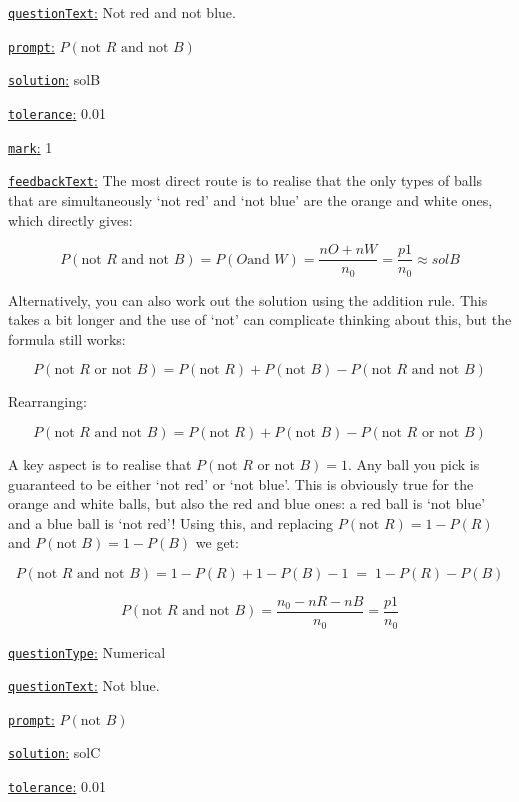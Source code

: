 \documentclass[preview]{standalone}
\newcommand \fieldname[1]{\underline{\texttt{#1}:}}
\begin{document}
{\fieldname{questionText}
Not red and not blue.

\fieldname{prompt}
$P(\textrm{not } R \textrm{ and not } B)$

\fieldname{solution}
solB

\fieldname{tolerance}
0.01

\fieldname{mark}
1

\fieldname{feedbackText}
The most direct route is to realise that the only types of balls that are simultaneously `not red' and `not blue' are the orange and white ones, which directly gives:

\[
P(\textrm{not } R \textrm{ and not } B) =  P( O \textrm{and } W) = \frac{{nO}+{nW}}{{n_0}} = \frac{{p1}}{{n_0}} \approx {solB}
\]

Alternatively, you can also work out the solution using the addition rule. This takes a bit longer and the use of `not' can complicate thinking about this, but the formula still works:

\[
P(\textrm{not } R \textrm{ or not } B) = P(\textrm{not } R) + P(\textrm{not } B) - P(\textrm{not } R \textrm{ and not } B)
\]

Rearranging:

\[
P(\textrm{not } R \textrm{ and not } B) = P(\textrm{not } R) + P(\textrm{not } B) - P(\textrm{not } R \textrm{ or not } B)
\]

A key aspect is to realise that $P(\textrm{not } R \textrm{ or not } B) = 1$. Any ball you pick is guaranteed to be either `not red' or `not blue'. This is obviously true for the orange and white balls, but also the red and blue ones: a red ball is `not blue' and a blue ball is `not red'! Using this, and replacing $P(\textrm{not } R) = 1 - P(R)$ and $P(\textrm{not } B) = 1 - P(B)$ we get:

\[
P(\textrm{not } R \textrm{ and not } B) = 1 - P(R) + 1 - P(B) - 1 \; = \; 1 - P(R) - P(B)
\]

\[
P(\textrm{not } R \textrm{ and not } B) = \frac{{n_0} - {nR} - {nB}}{{n_0}} = \frac{{p1}}{{n_0}}
\]

\fieldname{questionType}
Numerical

\fieldname{questionText}
Not blue.

\fieldname{prompt}
$P(\textrm{not } B)$

\fieldname{solution}
solC

\fieldname{tolerance}
0.01

}
\end{document}

